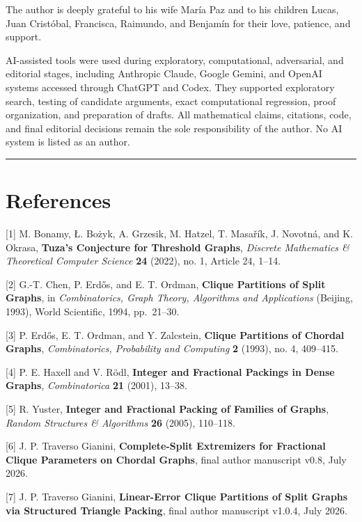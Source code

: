 \documentclass[11pt,a4paper]{article}
\begin{document}
The author is deeply grateful to his wife María Paz and to his children Lucas, Juan Cristóbal, Francisca, Raimundo, and Benjamín for their love, patience, and support.

AI-assisted tools were used during exploratory, computational, adversarial, and editorial stages, including Anthropic Claude, Google Gemini, and OpenAI systems accessed through ChatGPT and Codex. They supported exploratory search, testing of candidate arguments, exact computational regression, proof organization, and preparation of drafts. All mathematical claims, citations, code, and final editorial decisions remain the sole responsibility of the author. No AI system is listed as an author.

\begin{center}\rule{0.5\linewidth}{0.5pt}\end{center}

\section{References}\label{references}

{[}1{]} M. Bonamy, Ł. Bożyk, A. Grzesik, M. Hatzel, T. Masařík, J. Novotná, and K. Okrasa, \textbf{Tuza's Conjecture for Threshold Graphs}, \emph{Discrete Mathematics \& Theoretical Computer Science} \textbf{24} (2022), no. 1, Article 24, 1--14.

{[}2{]} G.-T. Chen, P. Erdős, and E. T. Ordman, \textbf{Clique Partitions of Split Graphs}, in \emph{Combinatorics, Graph Theory, Algorithms and Applications} (Beijing, 1993), World Scientific, 1994, pp.~21--30.

{[}3{]} P. Erdős, E. T. Ordman, and Y. Zalcstein, \textbf{Clique Partitions of Chordal Graphs}, \emph{Combinatorics, Probability and Computing} \textbf{2} (1993), no. 4, 409--415.

{[}4{]} P. E. Haxell and V. Rödl, \textbf{Integer and Fractional Packings in Dense Graphs}, \emph{Combinatorica} \textbf{21} (2001), 13--38.

{[}5{]} R. Yuster, \textbf{Integer and Fractional Packing of Families of Graphs}, \emph{Random Structures \& Algorithms} \textbf{26} (2005), 110--118.

{[}6{]} J. P. Traverso Gianini, \textbf{Complete-Split Extremizers for Fractional Clique Parameters on Chordal Graphs}, final author manuscript v0.8, July 2026.

{[}7{]} J. P. Traverso Gianini, \textbf{Linear-Error Clique Partitions of Split Graphs via Structured Triangle Packing}, final author manuscript v1.0.4, July 2026.
\end{document}
